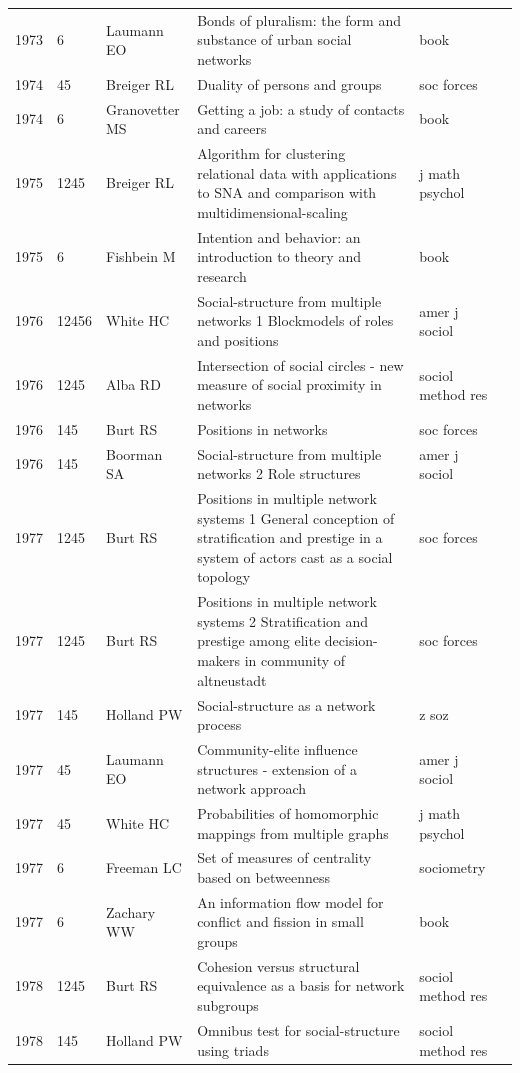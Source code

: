 \documentclass[11pt]{article} %
\begin{document}
\begin{landscape}
\begin{longtable}{p{0.7cm}|p{0.8cm}|p{3cm}|p{14.5cm}|p{3.5cm}l}
1973& 	6& 	 Laumann EO& 	 Bonds of pluralism: the form and substance of urban social networks& 	 book\\
1974& 	45& 	 Breiger RL& 	 Duality of persons and groups& 	 soc forces\\
1974& 	6& 	 Granovetter MS& 	 Getting a job: a study of contacts and careers& 	 book\\
1975& 	1245& 	 Breiger RL& 	 Algorithm for clustering relational data with applications to SNA and comparison with multidimensional-scaling& 	 j math psychol\\
1975& 	6& 	 Fishbein M& 	 Intention and behavior: an introduction to theory and research& 	 book\\
1976& 	12456& 	 White HC& 	 Social-structure from multiple networks 1 Blockmodels of roles and positions& 	 amer j sociol\\
1976& 	1245& 	 Alba RD& 	 Intersection of social circles - new measure of social proximity in networks& 	 sociol method res\\
1976& 	145& 	 Burt RS& 	 Positions in networks& 	 soc forces\\
1976& 	145& 	 Boorman SA& 	 Social-structure from multiple networks 2 Role structures& 	 amer j sociol\\
1977& 	1245& 	 Burt RS& 	 Positions in multiple network systems 1 General conception of stratification and prestige in a system of actors cast as a social topology& 	 soc forces\\
1977& 	1245& 	 Burt RS& 	 Positions in multiple network systems 2 Stratification and prestige among elite decision-makers in community of altneustadt& 	 soc forces\\
1977& 	145& 	 Holland PW& 	 Social-structure as a network process& 	 z soz\\
1977& 	45& 	 Laumann EO& 	 Community-elite influence structures - extension of a network approach& 	 amer j sociol\\
1977& 	45& 	 White HC& 	 Probabilities of homomorphic mappings from multiple graphs& 	 j math psychol\\
1977& 	6& 	 Freeman LC& 	 Set of measures of centrality based on betweenness& 	 sociometry\\
1977& 	6& 	 Zachary WW& 	 An information flow model for conflict and fission in small groups& 	 book\\
1978& 	1245& 	 Burt RS& 	 Cohesion versus structural equivalence as a basis for network subgroups& 	 sociol method res\\
1978& 	145& 	 Holland PW& 	 Omnibus test for social-structure using triads& 	 sociol method res\\

\end{longtable}
\end{landscape}
\end{document}
